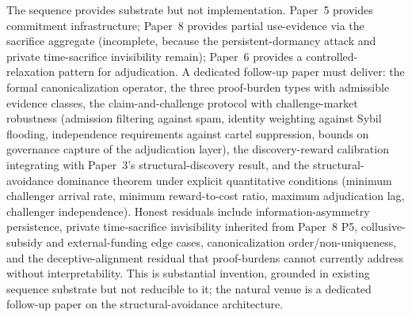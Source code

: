 \begin{enumerate}
The sequence provides substrate but not implementation.  Paper~5
provides commitment infrastructure; Paper~8 provides partial
use-evidence via the sacrifice aggregate (incomplete, because the
persistent-dormancy attack and private time-sacrifice
invisibility remain); Paper~6 provides a controlled-relaxation
pattern for adjudication.  A dedicated follow-up paper must
deliver: the formal canonicalization operator, the three
proof-burden types with admissible evidence classes, the
claim-and-challenge protocol with challenge-market robustness
(admission filtering against spam, identity weighting against
Sybil flooding, independence requirements against cartel
suppression, bounds on governance capture of the adjudication
layer), the discovery-reward calibration integrating with
Paper~3's structural-discovery result, and the structural-
avoidance dominance theorem under explicit quantitative
conditions (minimum challenger arrival rate, minimum
reward-to-cost ratio, maximum adjudication lag, challenger
independence).  Honest residuals include information-asymmetry
persistence, private time-sacrifice invisibility inherited from
Paper~8 P5, collusive-subsidy and external-funding edge cases,
canonicalization order/non-uniqueness, and the deceptive-alignment
residual that proof-burdens cannot currently address without
interpretability.  This is substantial invention, grounded in
existing sequence substrate but not reducible to it; the natural
venue is a dedicated follow-up paper on the structural-avoidance
architecture.
\end{enumerate}
